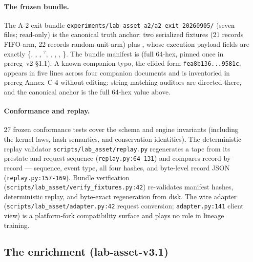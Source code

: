 \paragraph{The frozen bundle.}
The A-2 exit bundle \texttt{experiments/lab\_asset\_a2/a2\_exit\_20260905/}
(seven files; read-only) is the canonical truth anchor: two serialized
fixtures (21 records FIFO-arm, 22 records random-unit-arm) plus
, whose execution payload fields are exactly
\{, , ,
$^?$, , ,
, \}. The bundle manifest is
\bundlemanifest{} (full 64-hex, pinned once in prereg~v2 \S1.1). A known
companion typo, the elided form \texttt{fea8b136...9581c}, appears in five
lines across four companion documents and is inventoried in prereg Annex~C-4
without editing: string-matching auditors are directed there, and the
canonical anchor is the full 64-hex value above.

\paragraph{Conformance and replay.}
27 frozen conformance tests cover the schema and engine invariants
(including the kernel laws, hash semantics, and conservation identities).
The deterministic replay validator \texttt{scripts/lab\_asset/replay.py}
regenerates a tape from its prestate and request sequence
(\texttt{replay.py:64-131}) and compares record-by-record --- sequence,
event type, all four hashes, and byte-level record JSON
(\texttt{replay.py:157-169}). Bundle verification
(\texttt{scripts/lab\_asset/verify\_fixtures.py:42}) re-validates manifest
hashes, deterministic replay, and byte-exact regeneration from disk. The
wire adapter (\texttt{scripts/lab\_asset/adapter.py:42} request conversion;
\texttt{adapter.py:141} client view) is a platform-fork compatibility
surface and plays no role in lineage training.

\subsection{The enrichment (lab-asset-v3.1)}
\label{app:engine-enrichment}

